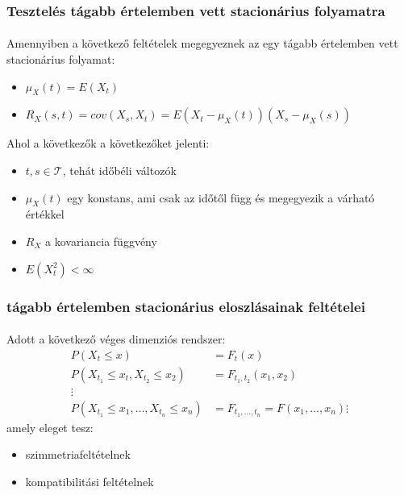 \documentclass[11pt,a4paper]{article}
\begin{document}
				\subsubsection{Tesztelés tágabb értelemben vett stacionárius folyamatra}
					\paragraph{}
						Amennyiben a következő feltételek megegyeznek az egy tágabb értelemben vett stacionárius folyamat:
						\begin{itemize}
							\item $\mu_X (t) = E(X_t)$
							\item $R_X(s,t) = cov(X_s, X_t) = E(X_t - \mu_X (t)) (X_s - \mu_X (s))$
						\end{itemize}
						Ahol a következők a következőket jelenti:
						\begin{itemize}
							\item $t, s \in \mathcal{T}$, tehát időbéli változók
							\item $\mu_X (t)$ egy konstans, ami csak az időtől függ és megegyezik a várható értékkel
							\item $R_X$ a kovariancia függvény
							\item $E(X_t^2) < \infty$ 
						\end{itemize}
				\subsubsection{tágabb értelemben stacionárius eloszlásainak feltételei}
					\paragraph{}
						Adott a következő véges dimenziós rendszer:
						$$\begin{aligned}
							P(X_t \le x) &= F_t(x) \\
							P(X_{t_1} \le x_t, X_{t_2} \le x_2) &=F_{t_1,t_2}(x_1,x_2) \\
							\vdots \\
							P(X_{t_1} \le x_1 , \dots, X_{t_n} \le x_n) &= F_{t_1, \dots, t_n}=F(x_1, \dots, x_n)
							\vdots
						\end{aligned}$$
						amely eleget tesz:
						\begin{itemize}
							\item szimmetriafeltételnek
							\item kompatibilitási feltételnek
						\end{itemize}
\end{document}
